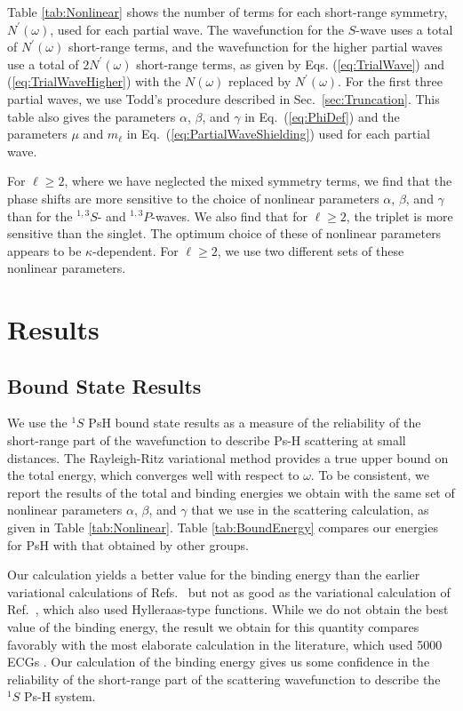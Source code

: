 \documentclass[preprint,showpacs,showkeys,preprintnumbers,amsmath,amssymb,longbibliography,pra,aps]{revtex4-1}
\begin{document}
{Table \ref{tab:Nonlinear} shows
the number of terms for each short-range 
symmetry, $N^\prime(\omega)$, used for each partial wave. The wavefunction
for the $S$-wave uses a 
total of $N^\prime(\omega)$ short-range terms, and the wavefunction for the
higher partial waves 
use a total of $2 N^\prime(\omega)$ short-range terms, as given by Eqs.
(\ref{eq:TrialWave}) and (\ref{eq:TrialWaveHigher}) with the 
$N(\omega)$ replaced by $N^\prime(\omega)$.
For the first three partial waves,
we use Todd's procedure described in Sec.~\ref{sec:Truncation}.
This table also gives the parameters $\alpha$, $\beta$, and
$\gamma$ in Eq.~(\ref{eq:PhiDef}) and the parameters $\mu$ and $m_\ell$ in 
Eq.~(\ref{eq:PartialWaveShielding}) used for each partial wave.

For $\ell \geq 2$, where we have neglected the mixed symmetry terms,
we find that the phase shifts are more sensitive to the
choice of nonlinear parameters $\alpha$, $\beta$, and $\gamma$
than for the $^{1,3}S$- and $^{1,3}P$-waves. We also find that for $\ell \geq 2$,
the triplet is more sensitive than the singlet. The optimum choice of these
of nonlinear parameters appears to be $\kappa$-dependent. For $\ell \geq 2$, we
use two different sets of these nonlinear parameters.


\section{Results}
\label{sec:Results}

\subsection{Bound State Results}

We use the $^1S$ PsH bound state results as a measure of the reliability of the 
short-range part of the wavefunction to describe Ps-H scattering at small 
distances. The Rayleigh-Ritz variational method provides a true upper
bound on the 
total energy, which converges well with respect to $\omega$. To 
be consistent, we report the results of the total and binding energies
we obtain with the same set of nonlinear parameters $\alpha$, $\beta$,
and $\gamma$ that we use in the scattering calculation, as given in
Table \ref{tab:Nonlinear}. Table \ref{tab:BoundEnergy} 
compares our energies for PsH with that obtained by other groups.

Our calculation yields a better value for the binding energy than the earlier 
variational calculations of Refs.~\cite{VanReeth2003,VanReeth2004} but not
as good as the variational calculation of Ref.~\cite{Yan1999}, which also
used Hylleraas-type functions. While we do not obtain the best value of the 
binding energy, the result
we obtain for this quantity compares favorably with the most elaborate 
calculation in the literature, which used 5000 ECGs \cite{Bubin2006}. Our 
calculation of the binding energy gives us some confidence in the reliability 
of the short-range part of the scattering wavefunction to describe the $^1S$ 
Ps-H system.

}
\end{document}
